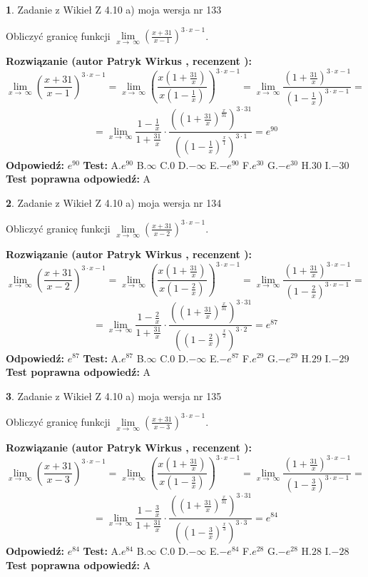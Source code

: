 \documentclass[12pt, a4paper]{article}
\theoremstyle{definition} %
\newtheorem{zad}{}
\newcommand{\zadStart}[1]{\begin{zad}#1\newline}
\newcommand{\zadStop}{\end{zad}}
\newcommand{\rozwStart}[2]{\noindent \textbf{Rozwiązanie (autor #1 , recenzent #2): }\newline}
\newcommand{\rozwStop}{\newline}
\newcommand{\odpStart}{\noindent \textbf{Odpowiedź:}\newline}
\newcommand{\odpStop}{\newline}
\newcommand{\testStart}{\noindent \textbf{Test:}\newline}
\newcommand{\testStop}{\newline}
\newcommand{\kluczStart}{\noindent \textbf{Test poprawna odpowiedź:}\newline}
\newcommand{\kluczStop}{\newline}
\begin{document}
\zadStart{Zadanie z Wikieł Z 4.10 a) moja wersja nr 133}

Obliczyć granicę funkcji  $\lim\limits_{x\to\ \infty}(\frac{x+31}{x-1})^{3\cdot x-1}$.
\zadStop
\rozwStart{Patryk Wirkus}{}
$$\lim\limits_{x\to\ \infty}(\frac{x+31}{x-1})^{3\cdot x-1} = \lim\limits_{x\to\ \infty}(\frac{x(1+\frac{31}{x})}{x(1-\frac{1}{x})})^{3\cdot x-1}=\lim\limits_{x\to\ \infty}\frac{(1+\frac{31}{x})^{3\cdot x-1}}{(1-\frac{1}{x})^{3\cdot x-1}}=$$
$$=\lim\limits_{x\to\ \infty}\frac{1-\frac{1}{x}}{1+\frac{31}{x}}\cdot\frac{((1+\frac{31}{x})^{\frac{x}{31}})^{3\cdot31}}{((1-\frac{1}{x})^{\frac{x}{1}})^{3\cdot1}}=e^{90}$$
\rozwStop
\odpStart
$e^{90}$
\odpStop
\testStart
A.$e^{90}$ B.$\infty$ C.$0$ D.$-\infty$ E.$-e^{90}$
F.$e^{30}$ G.$-e^{30}$
H.$30$
I.$-30$
\testStop
\kluczStart
A
\kluczStop



\zadStart{Zadanie z Wikieł Z 4.10 a) moja wersja nr 134}

Obliczyć granicę funkcji  $\lim\limits_{x\to\ \infty}(\frac{x+31}{x-2})^{3\cdot x-1}$.
\zadStop
\rozwStart{Patryk Wirkus}{}
$$\lim\limits_{x\to\ \infty}(\frac{x+31}{x-2})^{3\cdot x-1} = \lim\limits_{x\to\ \infty}(\frac{x(1+\frac{31}{x})}{x(1-\frac{2}{x})})^{3\cdot x-1}=\lim\limits_{x\to\ \infty}\frac{(1+\frac{31}{x})^{3\cdot x-1}}{(1-\frac{2}{x})^{3\cdot x-1}}=$$
$$=\lim\limits_{x\to\ \infty}\frac{1-\frac{2}{x}}{1+\frac{31}{x}}\cdot\frac{((1+\frac{31}{x})^{\frac{x}{31}})^{3\cdot31}}{((1-\frac{2}{x})^{\frac{x}{2}})^{3\cdot2}}=e^{87}$$
\rozwStop
\odpStart
$e^{87}$
\odpStop
\testStart
A.$e^{87}$ B.$\infty$ C.$0$ D.$-\infty$ E.$-e^{87}$
F.$e^{29}$ G.$-e^{29}$
H.$29$
I.$-29$
\testStop
\kluczStart
A
\kluczStop



\zadStart{Zadanie z Wikieł Z 4.10 a) moja wersja nr 135}

Obliczyć granicę funkcji  $\lim\limits_{x\to\ \infty}(\frac{x+31}{x-3})^{3\cdot x-1}$.
\zadStop
\rozwStart{Patryk Wirkus}{}
$$\lim\limits_{x\to\ \infty}(\frac{x+31}{x-3})^{3\cdot x-1} = \lim\limits_{x\to\ \infty}(\frac{x(1+\frac{31}{x})}{x(1-\frac{3}{x})})^{3\cdot x-1}=\lim\limits_{x\to\ \infty}\frac{(1+\frac{31}{x})^{3\cdot x-1}}{(1-\frac{3}{x})^{3\cdot x-1}}=$$
$$=\lim\limits_{x\to\ \infty}\frac{1-\frac{3}{x}}{1+\frac{31}{x}}\cdot\frac{((1+\frac{31}{x})^{\frac{x}{31}})^{3\cdot31}}{((1-\frac{3}{x})^{\frac{x}{3}})^{3\cdot3}}=e^{84}$$
\rozwStop
\odpStart
$e^{84}$
\odpStop
\testStart
A.$e^{84}$ B.$\infty$ C.$0$ D.$-\infty$ E.$-e^{84}$
F.$e^{28}$ G.$-e^{28}$
H.$28$
I.$-28$
\testStop
\kluczStart
A
\kluczStop
\end{document}
